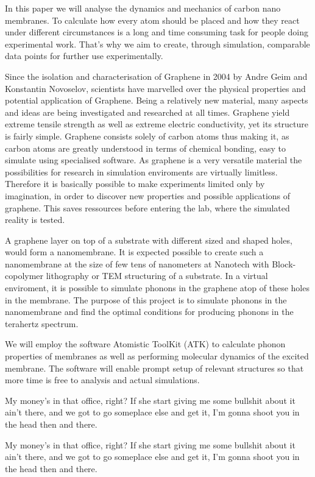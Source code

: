 
In this paper we will analyse the dynamics and mechanics of carbon nano membranes. To calculate how every atom should be placed and how they react under different circumstances is a long and time consuming task for people doing experimental work. That's why we aim to create, through simulation, comparable data points for further use experimentally.

Since the isolation and characterisation of
Graphene in 2004 by Andre Geim and
Konstantin Novoselov, scientists have marvelled over the physical properties and potential
application of Graphene. Being a relatively new material, many aspects and ideas are being
investigated and researched at all times. Graphene yield extreme tensile strength as well as
extreme electric conductivity, yet its structure is fairly simple. Graphene consists solely of
carbon atoms thus making it, as carbon atoms are greatly understood in terms of chemical
bonding, easy to simulate using specialised software. As graphene is a very versatile
material the possibilities for research in simulation enviroments are virtually limitless.
Therefore it is basically possible to make experiments limited only by imagination, in order
to discover new properties and possible applications of graphene. This saves ressources
before entering the lab, where the simulated reality is tested.

A graphene layer on top of a substrate with different sized and shaped holes, would
form a nanomembrane. It is expected possible to create such a nanomembrane at the
size of few tens of nanometers at Nanotech with Block-copolymer lithography or TEM
structuring of a substrate. In a virtual enviroment, it is possible to simulate phonons
in the graphene atop of these holes in the membrane. The purpose of this project is to
simulate phonons in the nanomembrane and find the optimal conditions for producing
phonons in the terahertz spectrum.

We will employ the software Atomistic ToolKit (ATK) to calculate phonon properties
of membranes as well as performing molecular dynamics of the excited membrane. The
software will enable prompt setup of relevant structures so that more time is free to analysis
and actual simulations.

My money's in that office, right? If she start giving me some bullshit about it ain't there, and we got to go someplace else and get it, I'm gonna shoot you in the head then and there.

My money's in that office, right? If she start giving me some bullshit about it ain't there, and we got to go someplace else and get it, I'm gonna shoot you in the head then and there.
